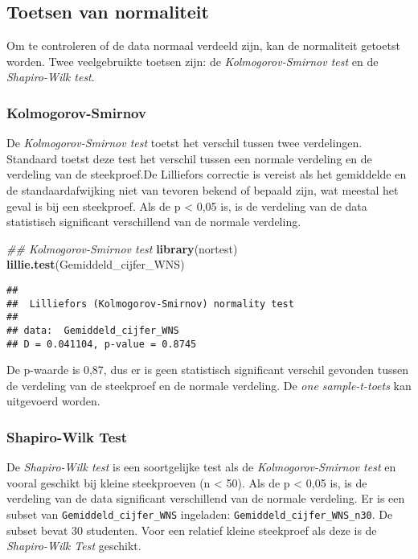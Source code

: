 \documentclass[
]{article}
\newenvironment{Shaded}{\begin{snugshade}}{\end{snugshade}}
\newcommand{\CommentTok}[1]{\textcolor[rgb]{0.56,0.35,0.01}{\textit{#1}}}
\newcommand{\KeywordTok}[1]{\textcolor[rgb]{0.13,0.29,0.53}{\textbf{#1}}}
\newcommand{\NormalTok}[1]{#1}
\begin{document}
\hypertarget{toetsen-van-normaliteit}{%
\subsection{Toetsen van normaliteit}\label{toetsen-van-normaliteit}}

Om te controleren of de data normaal verdeeld zijn, kan de normaliteit
getoetst worden. Twee veelgebruikte toetsen zijn: de
\emph{Kolmogorov-Smirnov test} en de \emph{Shapiro-Wilk test}.

\hypertarget{kolmogorov-smirnov}{%
\subsubsection{Kolmogorov-Smirnov}\label{kolmogorov-smirnov}}

De \emph{Kolmogorov-Smirnov test} toetst het verschil tussen twee
verdelingen. Standaard toetst deze test het verschil tussen een normale
verdeling en de verdeling van de steekproef.De Lilliefors correctie is
vereist als het gemiddelde en de standaardafwijking niet van tevoren
bekend of bepaald zijn, wat meestal het geval is bij een steekproef. Als
de p \textless{} 0,05 is, is de verdeling van de data statistisch
significant verschillend van de normale verdeling.

\begin{Shaded}
\begin{Highlighting}[]
\CommentTok{## Kolmogorov-Smirnov test}
\KeywordTok{library}\NormalTok{(nortest)}
\KeywordTok{lillie.test}\NormalTok{(Gemiddeld_cijfer_WNS)}
\end{Highlighting}
\end{Shaded}

\begin{verbatim}
## 
##  Lilliefors (Kolmogorov-Smirnov) normality test
## 
## data:  Gemiddeld_cijfer_WNS
## D = 0.041104, p-value = 0.8745
\end{verbatim}

De p-waarde is 0,87, dus er is geen statistisch significant verschil
gevonden tussen de verdeling van de steekproef en de normale verdeling.
De \emph{one sample-t-toets} kan uitgevoerd worden.

\hypertarget{shapiro-wilk-test}{%
\subsubsection{Shapiro-Wilk Test}\label{shapiro-wilk-test}}

De \emph{Shapiro-Wilk test} is een soortgelijke test als de
\emph{Kolmogorov-Smirnov test} en vooral geschikt bij kleine
steekproeven (n \textless{} 50). Als de p \textless{} 0,05 is, is de
verdeling van de data significant verschillend van de normale verdeling.
Er is een subset van \texttt{Gemiddeld\_cijfer\_WNS} ingeladen:
\texttt{Gemiddeld\_cijfer\_WNS\_n30}. De subset bevat 30 studenten. Voor
een relatief kleine steekproef als deze is de \emph{Shapiro-Wilk Test}
geschikt.
\end{document}
